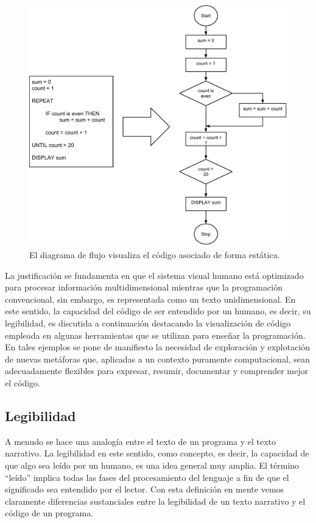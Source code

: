 \documentclass{llncs}
\begin{document}
\begin{figure}[ht]
\begin{center}
\includegraphics[scale=0.45]{images/flowchart2.pdf}
\caption{El diagrama de flujo visualiza el código asociado de forma estática.
\label{fig:flowchart}}
\end{center}
\end{figure}

La justificación se fundamenta en que el sistema visual humano está optimizado para procesar información multidimensional mientras que la programación convencional, sin embargo, es representada como un texto unidimensional. En este sentido, la capacidad del código de ser entendido por un humano, es decir, su legibilidad, es discutida a continuación destacando la visualización de código empleada en algunas herramientas que se utilizan para enseñar la programación. En tales ejemplos se pone de manifiesto la necesidad de exploración y explotación de nuevas metáforas que, aplicadas a un contexto puramente computacional, sean adecuadamente flexibles para expresar, resumir, documentar y comprender mejor el código. 

\subsection{Legibilidad}
\label{subsec:readability}
A menudo se hace una analogía entre el texto de un programa y el texto narrativo. La legibilidad en este sentido, como concepto, es decir, la capacidad de que algo sea leído por un humano, es una idea general muy amplia. El término ``leído'' implica todas las fases del procesamiento del lenguaje a fin de que el significado sea entendido por el lector. Con esta definición en mente vemos claramente diferencias sustanciales entre la legibilidad de un texto narrativo y el código de un programa. 
\end{document}
